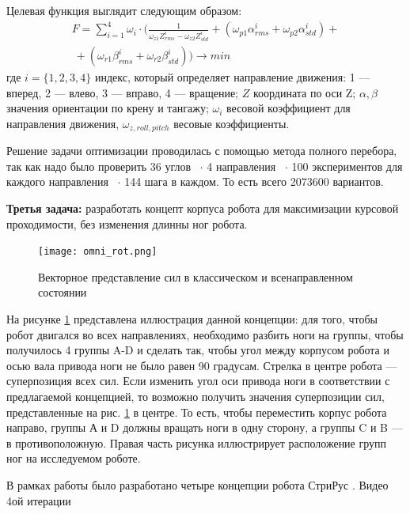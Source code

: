 Целевая функция выглядит следующим образом:
\begin{align}
    \label{eq:objective}
    F = \sum\limits_{i=1}^4 \omega_{i} \cdot (\frac{1}{\omega_{z1}Z_{rms}^i - \omega_{z2}Z_{std}^i}  + ( \omega_{p1}\alpha_{rms}^i + \omega_{p2}\alpha_{std}^i) + \nonumber \\\ + (\omega_{r1}\beta_{rms}^i + \omega_{r2}\beta_{std}^i)) \rightarrow min
\end{align}
где $i =\{1,2,3,4\}$ индекс, который определяет направление движения: 1 --- вперед, 2 --- влево, 3 --- вправо, 4 --- вращение; $Z$ координата по оси Z; $\alpha, \beta$ значения ориентации по крену и тангажу; $\omega_{i}$ весовой коэффициент для направления движения, ${\omega}_{z,roll,pitch}$ весовые коэффициенты.

Решение задачи оптимизации проводилась с помощью метода полного перебора, так как надо было проверить 36 углов ~$\cdot$ 4 направления ~$\cdot$ 100 экспериментов для каждого направления ~$\cdot$ 144 шага в каждом. То есть всего 2073600 вариантов.

\textbf{Третья задача:} разработать концепт корпуса робота для максимизации курсовой проходимости, без изменения длинны ног робота.

\begin{figure}[H]
    \centering\texttt{[image: omni\_rot.png]}
    \caption{Векторное представление сил в классическом и всенаправленном состоянии}
    \label{fig:omnidirection}
\end{figure}

На рисунке \ref{fig:omnidirection} представлена иллюстрация данной концепции: для того, чтобы робот двигался во всех направлениях, необходимо разбить ноги на группы, чтобы получилось 4 группы A-D и сделать так, чтобы угол между корпусом робота и осью вала привода ноги не было равен 90 градусам.
 Стрелка в центре робота — суперпозиция всех сил. Если изменить угол оси привода ноги в соответствии с предлагаемой концепцией, то возможно получить значения суперпозиции сил, представленные на рис. \ref{fig:omnidirection} в центре. То есть, чтобы переместить корпус робота направо, группы А и D должны вращать ноги в одну сторону, а группы C и B — в противоположную. Правая часть рисунка иллюстрирует расположение групп ног на исследуемом роботе. 

В рамках работы было разработано четыре концепции робота СтриРус . Видео 4ой итерации \quad {}

